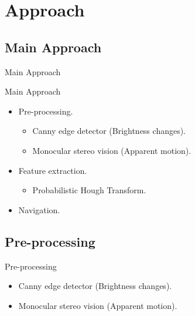 \documentclass{beamer}
\begin{document}
\section{Approach}
\subsection{Main Approach}
\begin{frame}
\begin{block}{Main Approach}
\end{block}
\end{frame}

\begin{frame}
\begin{block}{Main Approach}
\begin{itemize}
\item Pre-processing. 
\begin{itemize}
\item Canny edge detector (Brightness changes).
\item Monocular stereo vision (Apparent motion).
\end{itemize}
\item Feature extraction.
\begin{itemize}
\item Probabilistic Hough Transform.
\end{itemize}
\item Navigation.
\end{itemize}
\end{block}
\end{frame}

\subsection{Pre-processing}
\begin{frame}
\begin{block}{Pre-processing}
\begin{itemize}
\item Canny edge detector (Brightness changes).
\item Monocular stereo vision (Apparent motion).
\end{itemize}
\end{block}
\end{frame}
\end{document}
